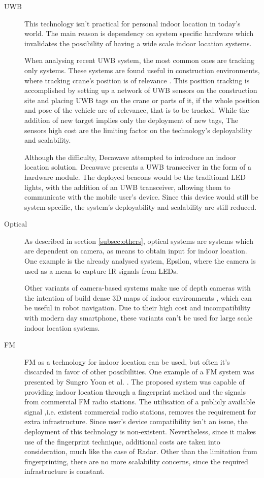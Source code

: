 \begin{description}
 
 
 
\item[\acf{UWB}] This technology isn't practical for personal indoor location in today's world. The main reason is dependency on system specific hardware which invalidates the possibility of having a wide scale indoor location systems. 
 
 
When analysing recent \ac{UWB} system, the most common ones are tracking only systems. These systems are found useful in construction environments, where tracking crane's position is of relevance \cite{uwb-ex1}. This position tracking is accomplished by setting up a network of \ac{UWB} sensors on the construction site and placing \ac{UWB} tags on the crane or parts of it, if the whole position and pose of the vehicle are of relevance, that is to be tracked. While the addition of new target implies only the deployment of new tags, The sensors high cost are the limiting factor on the technology's deployability and scalability.  
 
 
Although the difficulty, Decawave \cite{uwb-ex2} attempted to introduce an indoor location solution. Decawave presents a \ac{UWB} transceiver in the form of a hardware module. The deployed beacons would be the traditional LED lights, with the addition of an \ac{UWB} transceiver, allowing them to communicate with the mobile user's device. Since this device would still be system-specific, the system's deployability and scalability are still reduced. 
 
 
\item [Optical] As described in section \ref{subsec:others}, optical systems are systems which are dependent on camera, as means to obtain input for indoor location. One example is the already analysed system, Epsilon, where the camera is used as a mean to capture \ac{IR} signals from LEDs.  
 
 
Other variants of camera-based systems make use of depth cameras with the intention of build dense 3D maps of indoor environments \cite{camera_ex}, which can be useful in robot navigation. Due to their high cost and incompatibility with modern day smartphone, these variants can't be used for large scale indoor location systems. 
 
 
\item[FM]  FM as a technology for indoor location can be used, but often it's discarded in favor of other possibilities. One example of a FM system was presented by Sungro Yoon et al. \cite{fm_ex}. The proposed system was capable of providing indoor location through a fingerprint method and the signals from commercial \ac{FM} radio stations. The utilisation of a publicly available signal ,i.e. existent commercial radio stations, removes the requirement for extra infrastructure. Since user's device compatibility isn't an issue, the deployment of this technology is non-existent. Nevertheless, since it makes use of the fingerprint technique, additional costs are taken into consideration, much like the case of Radar. Other than the limitation from fingerprinting, there are no more scalability concerns, since the required infrastructure is constant. 
 

\end{description}
